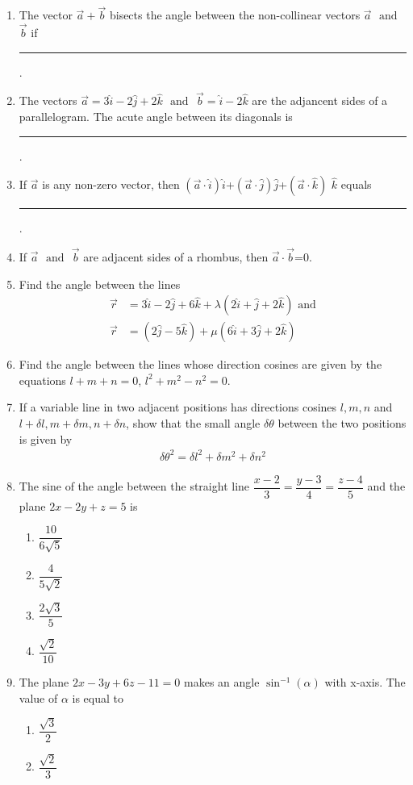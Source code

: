 \begin{enumerate}[label=\thesection.\arabic*,ref=\thesection.\theenumi]
\item The vector $\vec{a}+\vec{b}$ bisects the angle between the non-collinear vectors $\vec{a}$ $\text{ and }$ $\vec{b}$ if \rule{1cm}{0.15mm}.
\item The vectors $\vec{a}=3\hat{i}-2\hat{j}+2\hat{k}$ $\text{ and }$ $\vec{b}=\hat{i}-2\hat{k}$ are the adjancent sides of a parallelogram. The acute angle between its diagonals is \rule{1cm}{0.15mm}.
\item If $\vec{a}$ is  any non-zero vector, then $(\vec{a}\cdot \hat{i})\hat{i}$+$(\vec{a}\cdot \hat{j})\hat{j}$+$(\vec{a}\cdot \hat{k})$ $\hat{k}$ equals \rule{1cm}{0.15mm}.
\item If $\vec{a}$ $\text{ and }$ $\vec{b}$ are adjacent sides of a rhombus, then $\vec{a}\cdot \vec{b}$=0.
\item Find the angle between the lines 
\begin{align}
	\overrightarrow{r}&=3\hat{i}-2\hat{j}+6\hat{k}+\lambda(2\hat{i}+\hat{j}+2\hat{k})
	\text{ and}
	\\
	\overrightarrow{r}&=(2\hat{j}-5\hat{k})+\mu(6\hat{i}+3\hat{j}+2\hat{k})
\end{align}
%
\item Find the angle between the lines whose direction cosines are given by the equations $l+m+n=0$, $l^2+m^2-n^2=0$.
\item If a variable line in two adjacent positions has directions cosines $l, m, n$ and $l+\delta l, m+\delta m, n+\delta n$, show that the small angle $\delta\theta$ between the two positions is given by 
\begin{align}
	\delta\theta^2=\delta l^2+\delta m^2+\delta n^2
\end{align}
\item The sine of the angle between the straight line $\dfrac{x-2}{3}=\dfrac{y-3}{4}=\dfrac{z-4}{5}$ and the plane $2x-2y+z=5$ is
\begin{enumerate}
	\item $\dfrac{10}{6\sqrt{5}}$ 
	\item $\dfrac{4}{5\sqrt{2}}$
	\item $\dfrac{2\sqrt{3}}{5}$
	\item $\dfrac{\sqrt{2}}{10}$
\end{enumerate}
\item The plane $2x-3y+6z-11=0$ makes an angle $\sin^{-1}(\alpha)$ with x-axis. The value of $\alpha$ is equal to 
\begin{enumerate}
	\item  $\dfrac{\sqrt{3}}{2}$
	\item  $\dfrac{\sqrt{2}}{3}$

\end{enumerate}
\end{enumerate}
